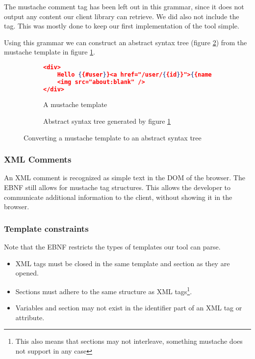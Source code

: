 \documentclass[thesis.tex]{subfiles}
\begin{document}
The mustache comment tag has been left out in this grammar, since it does not
output any content our client library can retrieve. We did also not include the
 tag. This was mostly done to keep our first
implementation of the tool simple.

Using this grammar we can construct an abstract syntax tree
(figure \ref{fig:ast.ast}) from the mustache template in figure
\ref{fig:ast.mustache}.

\begin{figure}
	\centering
	\begin{subfigure}{\linewidth}
		\caption{A mustache template}
		\label{fig:ast.mustache}
		\begin{lstlisting}[language=JSON]
<div>
	Hello {{#user}}<a href="/user/{{id}}">{{name}}</a>{{/user}}
	<img src="about:blank" />
</div>
		\end{lstlisting}
	\end{subfigure}
	
	\begin{subfigure}{\linewidth}
		\caption{Abstract syntax tree generated by figure \ref{fig:ast.mustache}}
		\label{fig:ast.ast}
		\resizebox{\linewidth}{!}{}
	\end{subfigure}
	\caption{Converting a mustache template to an abstract syntax tree}
	\label{fig:ast}
\end{figure}

\subsubsection{XML Comments}
An XML comment is recognized as simple text in the DOM of the browser. The EBNF
still allows for mustache tag structures. This allows the developer to
communicate additional information to the client, without showing it in the
browser.

\subsubsection{Template constraints}
\label{sec:template-constraints}
Note that the EBNF restricts the types of templates our tool can parse.

\begin{itemize}
\item XML tags must be closed in the same template and section as they are opened.
\item Sections must adhere to the same structure as XML tags\footnote{This also
	means that sections may not interleave, something mustache does not support in
	any case}.
\item Variables and section may not exist in the identifier part of an XML tag
  or attribute.
\end{itemize}
\end{document}

